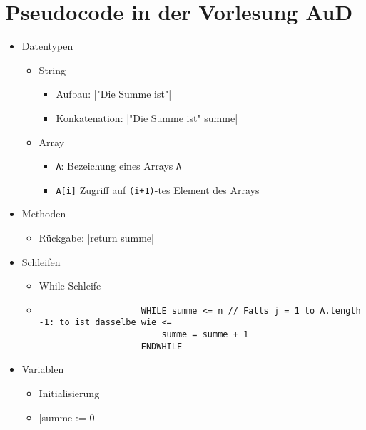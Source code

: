 \pagebreak

\section{Pseudocode in der Vorlesung AuD}

\begin{itemize}
    \item Datentypen
        \begin{itemize}
	    	\item String
	    		\begin{itemize}
	    			\item Aufbau: |"Die Summe ist"|
	    			\item Konkatenation: |"Die Summe ist" summe|  
                \end{itemize}
            \item Array
                \begin{itemize}
                    \item \texttt{A}: Bezeichung eines Arrays \texttt{A}
                    \item \texttt{A[i]} Zugriff auf \texttt{(i+1)}-tes Element des Arrays
                \end{itemize}
        \end{itemize}

    \item Methoden
        \begin{itemize}
            \item Rückgabe:
                |return summe| 
        \end{itemize}

    \item Schleifen 
        \begin{itemize}
	    	\item While-Schleife 
            \item[]
                \begin{verbatim}  
                    WHILE summe <= n // Falls j = 1 to A.length -1: to ist dasselbe wie <=
                        summe = summe + 1
                    ENDWHILE
                \end{verbatim}
        \end{itemize}
    
    \item Variablen
        \begin{itemize}
            \item Initialisierung
            \item[] |summe := 0| 
        \end{itemize}

\end{itemize}



